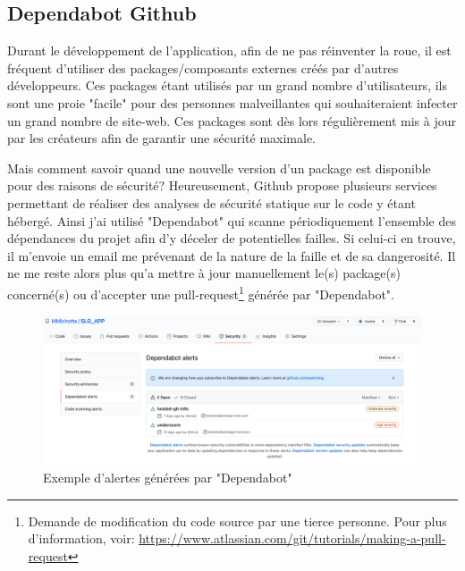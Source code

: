 \newpage 

\subsection{Dependabot Github}

Durant le développement de l'application, afin de ne pas réinventer la roue, il est fréquent d'utiliser des packages/composants externes créés par d'autres développeurs. Ces packages étant utilisés par un grand nombre d'utilisateurs, ils sont une proie "facile" pour des personnes malveillantes qui souhaiteraient infecter un grand nombre de site-web. Ces packages sont dès lors régulièrement mis à jour par les créateurs afin de garantir une sécurité maximale. 

\newpara 

Mais comment savoir quand une nouvelle version d'un package est disponible pour des raisons de sécurité? Heureusement, Github propose plusieurs services permettant de réaliser des analyses de sécurité statique sur le code y étant hébergé. Ainsi j'ai utilisé "Dependabot" qui scanne périodiquement l'ensemble des dépendances du projet afin d'y déceler de potentielles failles. Si celui-ci en trouve, il m'envoie un email me prévenant de la nature de la faille et de sa dangerosité. Il ne me reste alors plus qu'a mettre à jour manuellement le(s) package(s) concerné(s) ou d'accepter une pull-request\footnote{Demande de modification du code source par une tierce personne. Pour plus d'information, voir: \url{https://www.atlassian.com/git/tutorials/making-a-pull-request}} générée par "Dependabot".

\newpara

\begin{figure}[H]
  \centering
  \includegraphics[width=\linewidth]{img/dependabot.png}
  \caption{Exemple d'alertes générées par "Dependabot"}
\end{figure}